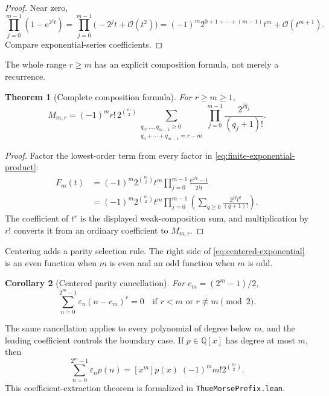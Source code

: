 \documentclass[11pt,oneside]{article}
\newtheorem{theorem}{Theorem}[section]
\newtheorem{corollary}[theorem]{Corollary}
\theoremstyle{definition}
\theoremstyle{remark}
\newcommand{\Q}{\mathbb Q}
\newcommand{\e}{\mathrm e}
\newcommand{\bigO}{\mathcal O}
\newcommand{\eps}{\varepsilon}
\newcommand{\lean}[1]{%
  \ifmmode\text{\nolinkurl{#1}}\else\nolinkurl{#1}\fi}
\begin{document}
\begin{proof}
Near zero,
\[
  \prod_{j=0}^{m-1}(1-\e^{2^jt})
  =\prod_{j=0}^{m-1}\bigl(-2^jt+\bigO(t^2)\bigr)
  =(-1)^m2^{0+1+\cdots+(m-1)}t^m+\bigO(t^{m+1}).
\]
Compare exponential-series coefficients.
\end{proof}

The whole range \(r\ge m\) has an explicit composition formula, not merely a
recurrence.

\begin{theorem}[Complete composition formula]
For \(r\ge m\ge1\),
\begin{equation}
  \boxed{
  M_{m,r}=(-1)^m r!\,2^{\binom m2}
  \sum_{\substack{q_0,\ldots,q_{m-1}\ge0\\
                  q_0+\cdots+q_{m-1}=r-m}}
  \prod_{j=0}^{m-1}
    \frac{2^{jq_j}}{(q_j+1)!}.}
  \label{eq:complete-power-moment}
\end{equation}
\end{theorem}

\begin{proof}
Factor the lowest-order term from every factor in
\eqref{eq:finite-exponential-product}:
\begin{align*}
 F_m(t)
 &=(-1)^m2^{\binom m2}t^m
   \prod_{j=0}^{m-1}
   \frac{\e^{2^jt}-1}{2^jt}\\
 &=(-1)^m2^{\binom m2}t^m
   \prod_{j=0}^{m-1}
   \left(\sum_{q\ge0}\frac{2^{jq}t^q}{(q+1)!}\right).
\end{align*}
The coefficient of \(t^r\) is the displayed weak-composition sum, and
multiplication by \(r!\) converts it from an ordinary coefficient to
\(M_{m,r}\).
\end{proof}

Centering adds a parity selection rule.  The right side of
\eqref{eq:centered-exponential} is an even function when \(m\) is even and an
odd function when \(m\) is odd.

\begin{corollary}[Centered parity cancellation]
For \(c_m=(2^m-1)/2\),
\begin{equation}
  \sum_{n=0}^{2^m-1}\eps_n(n-c_m)^r=0
  \quad\text{if }r<m\text{ or }r\not\equiv m\pmod2.
  \label{eq:centered-moment-parity}
\end{equation}
\end{corollary}

The same cancellation applies to every polynomial of degree below \(m\), and
the leading coefficient controls the boundary case.  If \(p\in\Q[x]\) has
degree at most \(m\), then
\begin{equation}
  \sum_{n=0}^{2^m-1}\eps_np(n)
   =[x^m]p(x)\;(-1)^m m!2^{\binom m2}.
  \label{eq:polynomial-coefficient-extraction}
\end{equation}
This coefficient-extraction theorem is formalized in
\lean{ThueMorsePrefix.lean}.
\end{document}

